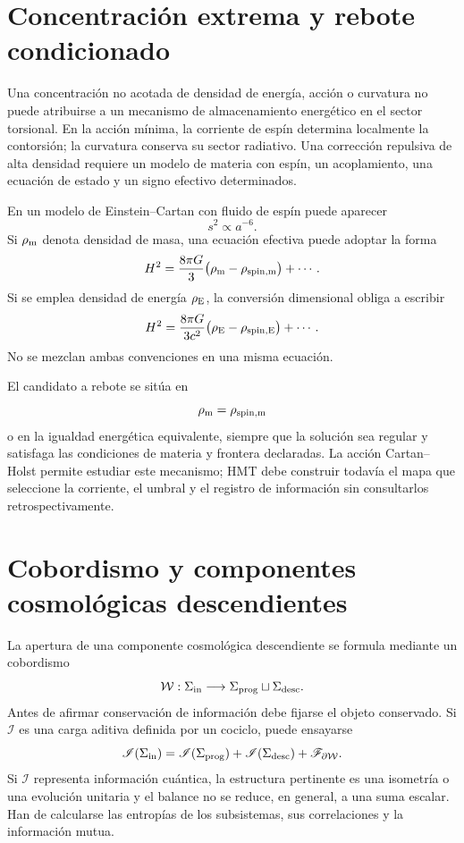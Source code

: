 \section{Concentración extrema y rebote condicionado}
\label{sec:rebote-cosmologico-condicionado}

Una concentración no acotada de densidad de energía, acción o curvatura no
puede atribuirse a un mecanismo de almacenamiento energético en el sector
torsional. En la acción mínima, la corriente de espín determina localmente la
contorsión; la curvatura conserva su sector radiativo. Una corrección
repulsiva de alta densidad requiere un modelo de materia con espín, un
acoplamiento, una ecuación de estado y un signo efectivo determinados.

En un modelo de Einstein--Cartan con fluido de espín puede aparecer
\[
 s^2\propto a^{-6}.
\]
Si \(\rho_{\rm m}\) denota densidad de masa, una ecuación efectiva puede
adoptar la forma
\[
 H^2
 =
 \frac{8\pi G}{3}
 \bigl(\rho_{\rm m}-\rho_{\rm spin,m}\bigr)
 +\cdots.
\]
Si se emplea densidad de energía \(\rho_{\rm E}\), la conversión dimensional
obliga a escribir
\[
 H^2
 =
 \frac{8\pi G}{3c^2}
 \bigl(\rho_{\rm E}-\rho_{\rm spin,E}\bigr)
 +\cdots.
\]
No se mezclan ambas convenciones en una misma ecuación.

El candidato a rebote se sitúa en
\[
 \rho_{\rm m}=\rho_{\rm spin,m}
\]
o en la igualdad energética equivalente, siempre que la solución sea regular
y satisfaga las condiciones de materia y frontera declaradas. La acción
Cartan--Holst permite estudiar este mecanismo; HMT debe construir todavía el
mapa que seleccione la corriente, el umbral y el registro de información sin
consultarlos retrospectivamente.

\section{Cobordismo y componentes cosmológicas descendientes}
\label{sec:cobordismo-universo-hijo}

La apertura de una componente cosmológica descendiente se formula mediante un cobordismo
\[
 \mathcal W:
 \Sigma_{\rm in}
 \longrightarrow
 \Sigma_{\rm prog}\sqcup\Sigma_{\rm desc}.
\]
Antes de afirmar conservación de información debe fijarse el objeto
conservado. Si \(\mathscr I\) es una carga aditiva definida por un cociclo,
puede ensayarse
\[
 \mathscr I(\Sigma_{\rm in})
 =
 \mathscr I(\Sigma_{\rm prog})
 +\mathscr I(\Sigma_{\rm desc})
 +\mathscr F_{\partial\mathcal W}.
\]
Si \(\mathscr I\) representa información cuántica, la estructura pertinente
es una isometría o una evolución unitaria y el balance no se reduce, en
general, a una suma escalar. Han de calcularse las entropías de los
subsistemas, sus correlaciones y la información mutua.


